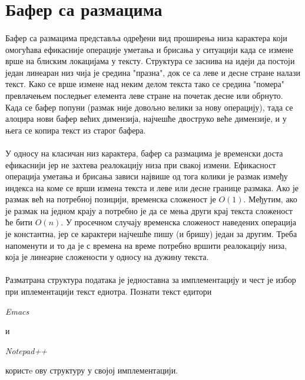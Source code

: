 \documentclass[12pt,oneside]{memoir}
\begin{document}
\section{Бафер са размацима}
\paragraph{}
Бафер са размацима представља одређени вид проширења низа карактера који омогућава
ефикасније операције уметања и брисања у ситуацији када се измене врше на блиским
локацијама у тексту. Структура се заснива на идеји да постоји један линеаран низ чија је средина "празна", док се са леве и десне стране налази текст.
Како се врше измене над неким делом текста тако се средина "помера" превлачењем последњег елемента леве стране на почетак десне или обрнуто. Када се бафер попуни (размак није довољно велики за нову операцију), тада се алоцира нови бафер већих димензија, најчешће двоструко веће димензије, и у њега се копира текст из старог бафера.

\paragraph{}
У односу на класичан низ карактера, бафер са размацима је временски доста 
ефикаснији јер не захтева реалокацију низа при свакој измени. Ефикасност операција уметања и брисања зависи највише од тога колики је размак између индекса на коме се  
врши измена текста и леве или десне границе размака. Ако је размак већ на потребној позицији, временска сложеност је \(O(1)\). Међутим, ако је размак на једном крају а
потребно је да се мења други крај текста сложеност ће бити \(O(n)\). У просечном случају
временска сложеност наведених операција је константна, јер се карактери најчешће пишу (и бришу) један за другим. Треба напоменути и то да је с времена на време потребно вршити
реалокацију низа, која је линеарне сложености у односу на дужину текста.

\paragraph{}
Разматрана структура података је једноставна за имплементацију и чест је избор
при иплементацији текст едиотра. Познати текст едитори \begin{latinica}\textit{Emacs}\end{latinica} \cite{Emacs} и 
\begin{latinica}\textit{Notepad++}\end{latinica} \cite{Notepad++}
користe ову структуру у својој имплементацији.
\end{document}
